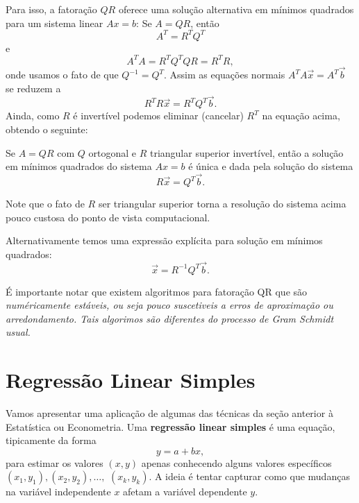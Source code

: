 \documentclass[../livro.tex]{subfiles}  %
\begin{document}
Para isso, a fatoração $QR$ oferece uma solução alternativa em mínimos quadrados para um sistema linear $Ax=b$:
Se $A=QR$, então 
$$
A^T=R^T Q^T$$
e
$$  A^T A= R^T Q^T Q R= R^T R,
$$ 
onde usamos o fato de que $Q^{-1}=Q^T$.
Assim as equações normais $A^T A \vec{x} = A^T \vec{b}$ se reduzem a 
$$ R^T R \vec{x} = R^T Q^T \vec{b}.$$
Ainda, como $R$ é invertível podemos eliminar (cancelar) $R^T$ na equação acima, %
obtendo o seguinte:
\begin{theorem}
  Se $A=QR$ com $Q$ ortogonal e $R$ triangular superior invertível, então 
  a solução em mínimos quadrados do sistema $Ax=b$ é única e dada pela solução do sistema
  $$  R \vec{x} =  Q^T \vec{b}.$$
\end{theorem}

Note que o fato de $R$ ser triangular superior torna a resolução do sistema acima pouco custosa do ponto de vista computacional.

Alternativamente temos uma expressão explícita para solução em mínimos quadrados: $$   \vec{x} = R^{-1} Q^T \vec{b}.$$

É importante notar que existem algoritmos para fatoração QR que são \it{numéricamente estáveis}, ou seja pouco suscetiveis a erros de aproximação ou arredondamento. Tais algorimos são diferentes do processo de Gram Schmidt usual.


\section{Regressão Linear Simples}

Vamos apresentar uma aplicação de algumas das técnicas da seção anterior à Estatística ou Econometria. Uma \textbf{regressão linear simples} é uma equação, tipicamente da forma
\[
y = a + b x,
\] para estimar os valores $(x,y)$ apenas conhecendo alguns valores específicos $(x_1, y_1), (x_2, y_2), \dots,$ $(x_k, y_k)$. A ideia é tentar capturar como que mudanças na variável independente $x$ afetam a variável dependente $y$.
\end{document}
